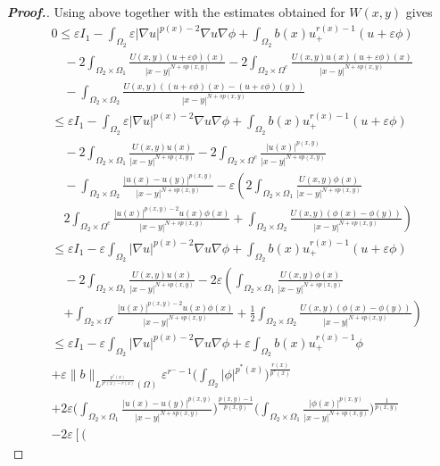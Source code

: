 \documentclass[11pt]{article}
\newcommand{\ve}{\varepsilon}
\newcommand{\om} {\Omega}
\newcommand{\na} {\nabla}
\begin{document}
\begin{proof}[\bf Proof.]
\noindent Using above together with the estimates obtained for $W(x,y)$ gives 
    \begin{align*}
&0  \le \ve I_1-
\int_{\om_2}\ve|\na u|^{p(x)-2}\na u\na \phi+
\int_{\om_2} b(x)u_+^{r(x)-1}(u+\ve\phi) \\
&\quad -2
\int_{\om_2\times \om_1} 
\frac{U(x,y)(u+\ve\phi)(x)}{|x-y|^{N+sp(x,y)}} -2
\int_{\om_2\times \om^c} 
\frac{U(x,y)u(x)(u+\ve\phi)(x)}{|x-y|^{N+sp(x,y)}}\\
& \quad  -
\int_{\om_2\times \om_2} 
\frac{U(x,y)((u+\ve\phi)(x)-(u+\ve\phi)(y))}
{|x-y|^{N+sp(x,y)}}\\
    & \le  \ve I_1-
\int_{\om_2}\ve|\na u|^{p(x)-2}\na u\na \phi+
\int_{\om_2} b(x)u_+^{r(x)-1}(u+\ve\phi) \\
& \quad -2 \int_{\om_2\times \om_1} 
\frac{U(x,y)u(x)}{|x-y|^{N+sp(x,y)}} -2
\int_{\om_2\times \om^c} 
\frac{|u(x)|^{p(x,y)}}{|x-y|^{N+sp(x,y)}} \\
& \quad  - \int_{\om_2\times \om_2} 
\frac{|u(x)-u(y)|^{p(x,y)}}{|x-y|^{N+sp(x,y)}}-\ve
\left (2
\int_{\om_2\times \om_1} 
\frac{U(x,y)\phi(x)}{|x-y|^{N+sp(x,y)}}\right.\\
    & \quad \left. 2
\int_{\om_2\times \om^c} 
\frac{|u(x)|^{p(x,y)-2}u(x)\phi(x)}{|x-y|^{N+sp(x,y)}}+
\int_{\om_2\times \om_2} 
\frac{U(x,y)(\phi(x)-\phi(y))}{|x-y|^{N+sp(x,y)}}
\right )\\
    & \le  \ve I_1-\ve
\int_{\om_2}|\na u|^{p(x)-2}\na u\na \phi+
\int_{\om_2} b(x)u_+^{r(x)-1}(u+\ve\phi)\\
& \quad  -2
\int_{\om_2\times \om_1} 
\frac{U(x,y)u(x)}{|x-y|^{N+sp(x,y)}}
-2\ve
\left (
\int_{\om_2\times \om_1} 
\frac{U(x,y)\phi(x)}{|x-y|^{N+sp(x,y)}} \right. \\
& \quad \left. +
\int_{\om_2\times \om^c} 
\frac{|u(x)|^{p(x,y)-2}u(x)\phi(x)}
{|x-y|^{N+sp(x,y)}} + \frac{1}{2}
\int_{\om_2\times \om_2} 
\frac{U(x,y)(\phi(x)-\phi(y))}
{|x-y|^{N+sp(x,y)}}
\right )\\
    & \le   \ve I_1-\ve
\int_{\om_2}|\na u|^{p(x)-2}\na u\na \phi+\ve
\int_{\om_2} b(x)u_+^{r(x)-1}\phi \\
& +\ve\|b\|_{L^{
\frac{p^*(x)}{p^*(x)-r(x)}}(\om)}\ve^{r^--1}\Big (
\int_{\om_2}|\phi|^{p^*(x)}\Big )^{
\frac{r(x)}{p^*(x)}}\\
    &+2\ve\Big (
\int_{\om_2\times \om_1} 
\frac{|u(x)-u(y)|^{p(x,y)}}{|x-y|^{N+sp(x,y)}}\Big )^{
\frac{p(x,y)-1}{p(x,y)}}\Big (
\int_{\om_2\times \om_1} 
\frac{|\phi(x)|^{p(x,y)}}{|x-y|^{N+sp(x,y)}}\Big )^{
\frac{1}{p(x,y)}}\\
    &-2\ve\left[\Big (

\end{align*}
\end{proof}
\end{document}
